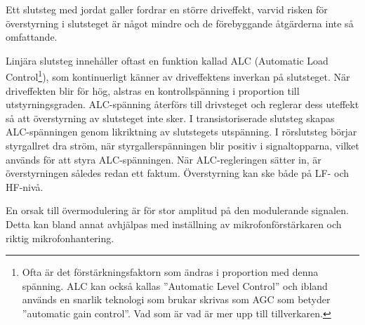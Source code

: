 Ett slutsteg med jordat galler fordrar en större driveffekt, varvid risken för
överstyrning i slutsteget är något mindre och de förebyggande åtgärderna inte så
omfattande.

Linjära slutsteg innehåller oftast en funktion kallad ALC (Automatic Load
Control\footnote{Ofta är det förstärkningsfaktorn som ändras i proportion med
  denna spänning. ALC kan också kallas ''Automatic Level Control'' och ibland
  används en snarlik teknologi som brukar skrivas som AGC som betyder
  ''automatic gain control''. Vad som är vad är mer upp till tillverkaren.}),
som kontinuerligt känner av driveffektens inverkan på slutsteget. När
driveffekten blir för hög, alstras en kontrollspänning i proportion till
utstyrningsgraden. ALC-spänning återförs till drivsteget och reglerar dess
uteffekt så att överstyrning av slutsteget inte sker. I transistoriserade
slutsteg skapas ALC-spänningen genom likriktning av slutstegets utspänning. I
rörslutsteg börjar styrgallret dra ström, när styrgallerspänningen blir positiv
i signaltopparna, vilket används för att styra ALC-spänningen. När
ALC-regleringen sätter in, är överstyrningen således redan ett faktum.
Överstyrning kan ske både på LF- och HF-nivå.

En orsak till övermodulering är för stor amplitud på den modulerande signalen.
Detta kan bland annat avhjälpas med inställning av mikrofonförstärkaren och
riktig mikrofonhantering.
